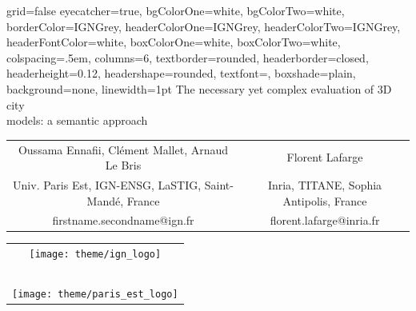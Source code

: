 \documentclass[portrait, a0paper, margin=.5cm]{baposter}
\begin{document}
    \begin{poster}%
    {
        grid=false
        eyecatcher=true,
        bgColorOne=white,
        bgColorTwo=white,
        borderColor=IGNGrey,
        headerColorOne=IGNGrey,
        headerColorTwo=IGNGrey,
        headerFontColor=white,
        boxColorOne=white,
        boxColorTwo=white,
        colspacing=.5em,
        columns=6,
        textborder=rounded,
        headerborder=closed,
        headerheight=0.12\textheight,
        headershape=rounded,
        textfont={\color{IGNDarkGrey}},
        boxshade=plain,
        background=none,
        linewidth=1pt
    }
    {}
    {
        \color{IGNDarkGrey}
        The necessary yet complex evaluation of 3D city\\models: a semantic approach
    }
    {
        \vspace{.5cm}
        \color{IGNDarkGrey}
        \begin{tabular}{c c}
            \small Oussama Ennafii, Clément Mallet, Arnaud Le Bris & \small Florent Lafarge\\
            \small Univ. Paris Est, IGN-ENSG, LaSTIG, Saint-Mandé, France & \small Inria, TITANE, Sophia Antipolis, France\\
            \small firstname.secondname@ign.fr & \small florent.lafarge@inria.fr
        \end{tabular}
    }
    {
        \begin{tabular}{c}
            \texttt{[image: theme/ign\_logo]}\\~\\
            \texttt{[image: theme/paris\_est\_logo]}
        \end{tabular}
    }



\end{poster}
\end{document}
